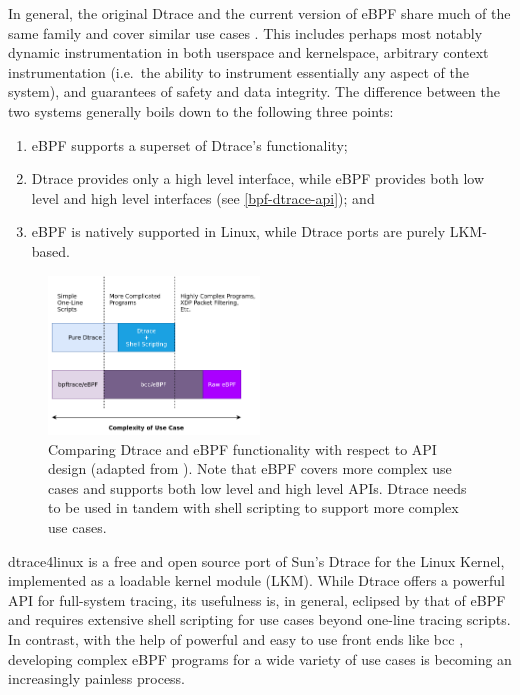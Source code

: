 \documentclass[
  12pt]{findlay}
\begin{document}
In general, the original Dtrace and the current version of eBPF share
much of the same family and cover similar use cases
\autocite{cantrill04,starovoitov13,starovoitov14}. This includes perhaps
most notably dynamic instrumentation in both userspace and kernelspace,
arbitrary context instrumentation (i.e.~the ability to instrument
essentially any aspect of the system), and guarantees of safety and data
integrity. The difference between the two systems generally boils down
to the following three points:

\begin{enumerate}
\def\labelenumi{(\arabic{enumi})}
\tightlist
\item
  eBPF supports a superset of Dtrace's functionality;
\item
  Dtrace provides only a high level interface, while eBPF provides both
  low level and high level interfaces (see \autoref{bpf-dtrace-api});
  and
\item
  eBPF is natively supported in Linux, while Dtrace ports are purely
  LKM-based.
\end{enumerate}

\begin{figure}
\includegraphics[width=0.5\textwidth]{../figures/bpf-dtrace-api.png}
\caption[Comparing Dtrace and eBPF functionality with respect to API design]
{
Comparing Dtrace and eBPF functionality with respect to API design (adapted from \cite{gregg18}).
Note that eBPF covers more complex use cases and supports both low level
and high level APIs. Dtrace needs to be used in tandem with shell
scripting to support more complex use cases.
}
\label{bpf-dtrace-api}
\end{figure}

dtrace4linux \autocite{dtrace4linux} is a free and open source port of
Sun's Dtrace \autocite{cantrill04} for the Linux Kernel, implemented as
a loadable kernel module (LKM). While Dtrace offers a powerful API for
full-system tracing, its usefulness is, in general, eclipsed by that of
eBPF \autocite{gregg18} and requires extensive shell scripting for use
cases beyond one-line tracing scripts. In contrast, with the help of
powerful and easy to use front ends like bcc \autocite{bcc}, developing
complex eBPF programs for a wide variety of use cases is becoming an
increasingly painless process.
\end{document}
